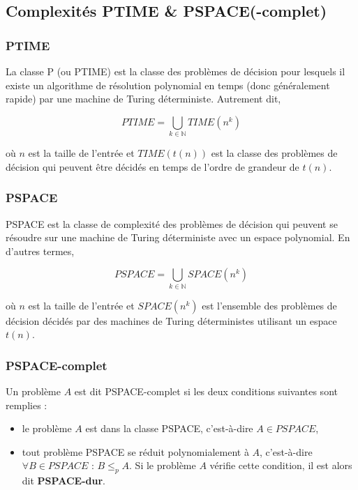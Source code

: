 \documentclass[runningheads,a4paper,10pt]{llncs}
\begin{document}
\begin{subappendices}
\subsection{Complexités PTIME \& PSPACE(-complet)}

\subsubsection{PTIME}
La classe P (ou PTIME) est la classe des problèmes de décision pour lesquels il existe un algorithme de résolution polynomial en temps (donc généralement rapide) par une
machine de Turing déterministe. Autrement dit, 

$$ PTIME = \bigcup_{k \in \mathbb{N}} TIME(n^{k}) $$

où $n$ est la taille de l'entrée et $TIME(t(n))$ est la classe des problèmes de décision qui peuvent être décidés en temps de l'ordre de grandeur de $t(n)$.

\subsubsection{PSPACE} 
PSPACE est la classe de complexité des problèmes de décision qui peuvent se résoudre sur une machine de Turing déterministe avec un espace polynomial. En d’autres termes, 

$$ PSPACE = \bigcup_{k \in \mathbb{N}} SPACE(n^{k}) $$

où $n$ est la taille de l'entrée et $SPACE(n^{k})$ est l'ensemble des problèmes de décision décidés par des machines de Turing déterministes utilisant un espace $t(n)$.

\subsubsection{PSPACE-complet}
Un problème $A$ est dit PSPACE-complet si les deux conditions suivantes sont remplies : 

\begin{itemize}
\item le problème $A$ est dans la classe PSPACE, c'est-à-dire $A \in PSPACE$,
\item tout problème PSPACE se réduit polynomialement à $A$, c'est-à-dire $\forall B \in PSPACE$ : $B \le_{p} A$. Si le problème $A$ vérifie cette condition, il est alors dit \textbf{PSPACE-dur}.
\end{itemize}

\end{subappendices}


\nocite{*}

\end{document}
